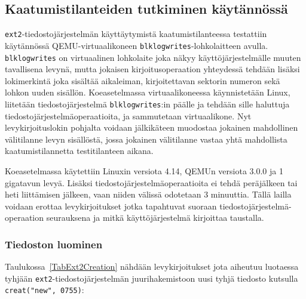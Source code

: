 \subsection{Kaatumistilanteiden tutkiminen käytännössä}
\texttt{ext2}-tiedostojärjestelmän käyttäytymistä kaatumistilanteessa testattiin käytännössä QEMU-virtuaalikoneen \texttt{blk\-log\-writes}-lohkolaitteen avulla.
\texttt{blk\-log\-writes} on virtuaalinen lohkolaite joka näkyy käyttöjärjestelmälle muuten tavallisena levynä,
mutta jokaisen kirjoitusoperaation yhteydessä tehdään lisäksi lokimerkintä joka sisältää aikaleiman, kirjoitettavan sektorin numeron sekä lohkon uuden sisällön.
Koeasetelmassa virtuaalikoneessa käynnistetään Linux,
liitetään tiedostojärjestelmä \texttt{blklogwrites}:in päälle ja tehdään sille haluttuja tiedostojärjestelmäoperaatioita,
ja sammutetaan virtuaalikone.
Nyt levykirjoituslokin pohjalta voidaan jälkikäteen muodostaa jokainen mahdollinen välitilanne levyn sisällöstä,
jossa jokainen välitilanne vastaa yhtä mahdollista kaatumistilannetta testitilanteen aikana.

Koeasetelmassa käytettiin Linuxin versiota 4.14, QEMUn versiota 3.0.0 ja 1 gigatavun levyä.
Lisäksi tiedostojärjestelmäoperaatioita ei tehdä peräjälkeen tai heti liittämisen jälkeen,
vaan niiden välissä odotetaan 3 minuuttia.
Tällä lailla voidaan erottaa levykirjoitukset jotka tapahtuvat suoraan tiedostojärjestelmä-operaation seurauksena
ja mitkä käyttöjärjestelmä kirjoittaa taustalla. 

\subsubsection{Tiedoston luominen}
\label{ChapExt2FileCreation}
Taulukossa~\ref{TabExt2Creation} nähdään levykirjoitukset jota aiheutuu luotaessa tyhjään \texttt{ext2}-tiedostojärjestelmän juurihakemistoon uusi tyhjä tiedosto kutsulla \texttt{creat("new", 0755)}:

